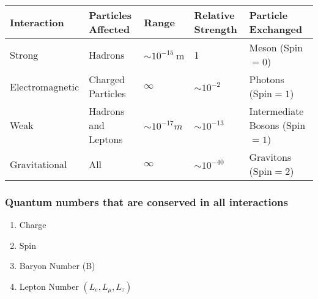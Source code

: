 	\begin{table}[H]
	\centering
	\renewcommand*{\arraystretch}{1.7}
	\begin{tabular}{|p{2.5cm}| p{1.5cm}|p{2cm}|p{2cm}|p{1.8cm}|}
			\hline Interaction & Particles Affected & Range & Relative Strength& Particle Exchanged \\
			\hline Strong & Hadrons & $\sim 10^{-15} \mathrm{~m}$ & 1 & Meson (Spin$=0$)\\\hline
			Electromagnetic&Charged Particles &$\infty$&$\sim 10^{-2}$&Photons (Spin$=1$)\\\hline
			Weak&Hadrons and Leptons &$\sim 10^{-17}m$&$\sim 10^{-13}$&Intermediate Bosons (Spin $=1$)\\\hline
			Gravitational&All&$\infty$&$\sim 10^{-40}$&Gravitons (Spin$=2$)\\\hline
	\end{tabular}
\end{table}


























\subsubsection{Quantum numbers that are conserved in all interactions}
\begin{enumerate}[label=\alph*)]
	\item  Charge
	\item  Spin
	\item  Baryon Number (B)
	\item  Lepton Number $\left(L_e, L_\mu, L_\tau\right)$
\end{enumerate}

